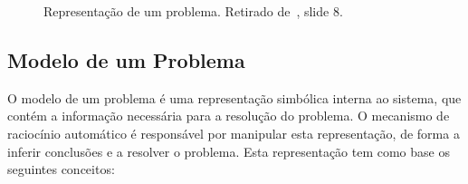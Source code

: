 \begin{figure}[H]
    \label{fig:representacao-problema}
    \begin{center}
    \end{center}
    \caption{Representação de um problema.
    Retirado de~\cite{isel:iasa:slides:racicionio-automatico}, slide 8.}
\end{figure}

\subsection{Modelo de um Problema}\label{subsec:modelo-problema}

O modelo de um problema é uma representação simbólica interna ao sistema, que contém a informação necessária para a resolução do problema.
O mecanismo de raciocínio automático é responsável por manipular esta representação, de forma a inferir conclusões e a resolver o problema. Esta representação tem como base os seguintes conceitos:


